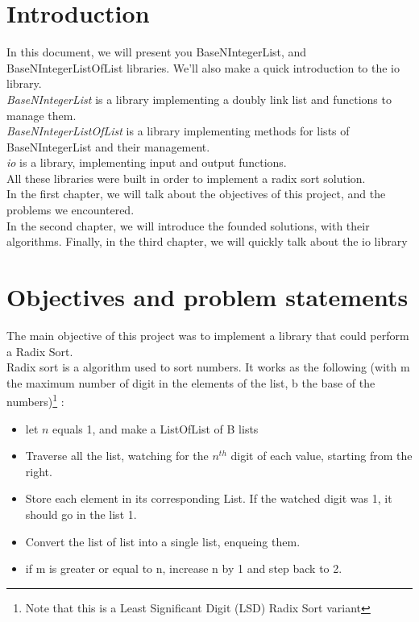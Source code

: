 \documentclass[book, backcover, english, nodocumentinfo]{upmethodology-document}
\begin{document}
\chapter*{Introduction}
In this document, we will present you BaseNIntegerList, and BaseNIntegerListOfList libraries. We'll also make a quick introduction to the io library.\\
\qquad \textit{BaseNIntegerList} is a library implementing a doubly link list and functions to manage them.\\
\qquad \textit{BaseNIntegerListOfList} is a library implementing methods for lists of BaseNIntegerList and their management.\\
\qquad \textit{io} is a library, implementing input and output functions.\\

All these libraries were built in order to implement a radix sort solution.\\

In the first chapter, we will talk about the objectives of this project, and the problems we encountered.\\
In the second chapter, we will introduce the founded solutions, with their algorithms.
Finally, in the third chapter, we will quickly talk about  the io library
\tableofcontents{}
\chapter{Objectives and problem statements}
The main objective of this project was to implement a library that could perform a Radix Sort.\\
Radix sort is a algorithm used to sort numbers. It works as the following (with m the maximum number of digit in the elements of the list, b the base of the numbers)\footnote{Note that this is a Least Significant Digit (LSD) Radix Sort variant} :\\
\begin{itemize}
	\item[1]{} let \(n\) equals 1, and make a ListOfList of B lists
	\item[2]{} Traverse all the list, watching for the \(n^{th}\) digit of each value, starting from the right.
	\item[3]{} Store each element in its corresponding List. If the watched digit was 1, it should go in the  list 1.
	\item[4]{} Convert the list of list into a single list, enqueing them.
	\item[5]{} if m is greater or equal to n, increase n by 1 and step back to 2.
\end{itemize}
\end{document}
